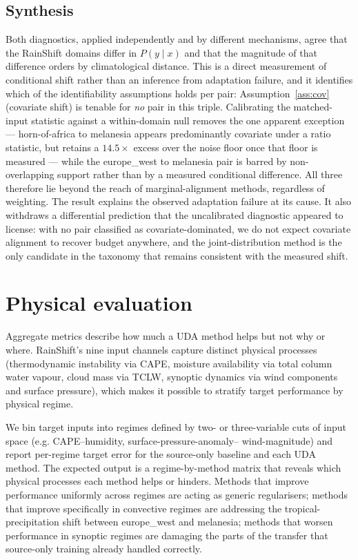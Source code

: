\documentclass{article}
\begin{document}
\subsection{Synthesis}

Both diagnostics, applied independently and by different mechanisms,
agree that the RainShift domains differ in $P(y\mid x)$ and that the
magnitude of that difference orders by climatological distance. This is
a direct measurement of conditional shift rather than an inference from
adaptation failure, and it identifies which of the identifiability
assumptions holds per pair: Assumption~\ref{ass:cov} (covariate shift)
is tenable for \emph{no} pair in this triple. Calibrating the
matched-input statistic against a within-domain null removes the one
apparent exception --- horn-of-africa to melanesia appears
predominantly covariate under a ratio statistic, but retains a
$14.5\times$ excess over the noise floor once that floor is measured ---
while the europe\_west to melanesia pair is barred by non-overlapping
support rather than by a measured conditional difference. All three
therefore lie beyond the reach of marginal-alignment methods, regardless
of weighting. The result explains the observed adaptation failure at its
cause. It also withdraws a differential prediction that the
uncalibrated diagnostic appeared to license: with no pair classified as
covariate-dominated, we do not expect covariate alignment to recover
budget anywhere, and the joint-distribution method is the only candidate
in the taxonomy that remains consistent with the measured shift.

\section{Physical evaluation}\label{sec:physical}

Aggregate metrics describe how much a UDA method helps but not why or
where. RainShift's nine input channels capture distinct physical
processes (thermodynamic instability via CAPE, moisture availability
via total column water vapour, cloud mass via TCLW, synoptic dynamics
via wind components and surface pressure), which makes it possible to
stratify target performance by physical regime.

We bin target inputs into regimes defined by two- or three-variable
cuts of input space (e.g. CAPE--humidity, surface-pressure-anomaly--%
wind-magnitude) and report per-regime target error for the source-only
baseline and each UDA method. The expected output is a regime-by-method
matrix that reveals which physical processes each method helps or
hinders. Methods that improve performance uniformly across regimes are
acting as generic regularisers; methods that improve specifically in
convective regimes are addressing the tropical-precipitation shift
between europe\_west and melanesia; methods that worsen performance
in synoptic regimes are damaging the parts of the transfer that
source-only training already handled correctly.
\end{document}

